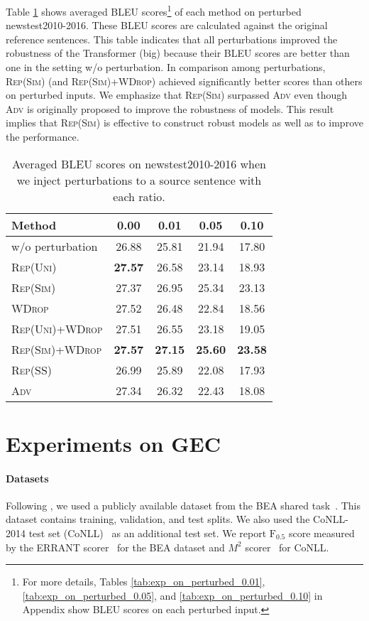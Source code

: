 \documentclass[11pt]{article}
\newcommand{\fscore}{\ensuremath{\mathrm{F}_{0.5}}}
\newcommand{\uniform}{\textsc{Rep(Uni)}}
\newcommand{\parass}{\textsc{Rep(SS)}}
\newcommand{\similarity}{\textsc{Rep(Sim)}}
\newcommand{\worddrop}{\textsc{WDrop}}
\newcommand{\adv}{\textsc{Adv}}
\begin{document}
Table \ref{tab:exp_on_perturbed_input} shows averaged BLEU scores\footnote{For more details, Tables \ref{tab:exp_on_perturbed_0.01}, \ref{tab:exp_on_perturbed_0.05}, and \ref{tab:exp_on_perturbed_0.10} in Appendix show BLEU scores on each perturbed input.} of each method on perturbed newstest2010-2016.
These BLEU scores are calculated against the original reference sentences.
This table indicates that all perturbations improved the robustness of the Transformer (big) because their BLEU scores are better than one in the setting w/o perturbation.
In comparison among perturbations, \similarity{} (and \similarity{}+\worddrop{}) achieved significantly better scores than others on perturbed inputs.
We emphasize that \similarity{} surpassed \adv{} even though \adv{} is originally proposed to improve the robustness of models.
This result implies that \similarity{} is effective to construct robust models as well as to improve the performance.


\begin{table}[!t]
  \centering
  \footnotesize
  \begin{tabular}{ l | c | c | c | c } \hline
  Method & 0.00 & 0.01 & 0.05 & 0.10 \\ \hline 
  w/o perturbation & 26.88 & 25.81 & 21.94 & 17.80 \\ \hline
  \uniform{} & \textbf{27.57} & 26.58 & 23.14 & 18.93 \\
  \similarity{} & 27.37 & 26.95 & 25.34 & 23.13 \\
  \worddrop{} & 27.52 & 26.48 & 22.84 & 18.56 \\
  \uniform{}+\worddrop{} & 27.51 & 26.55 & 23.18 & 19.05\\
  \similarity{}+\worddrop{} & \textbf{27.57} & \textbf{27.15} & \textbf{25.60} & \textbf{23.58} \\
  \parass{} & 26.99 & 25.89 & 22.08 & 17.93 \\
  \adv{} & 27.34 & 26.32 & 22.43 & 18.08 \\ \hline
  \end{tabular}
  \caption{Averaged BLEU scores on newstest2010-2016 when we inject perturbations to a source sentence with each ratio.\label{tab:exp_on_perturbed_input}}
\end{table}


\section{Experiments on GEC}
\label{sec:gec}


\paragraph{Datasets}
Following , we used a publicly available dataset from the BEA shared task~\cite{bryant:2019:bea}.
This dataset contains training, validation, and test splits.
We also used the CoNLL-2014 test set (CoNLL)~\citep{ng:2014:conll} as an additional test set.
We report \fscore{} score measured by the ERRANT scorer~\cite{bryant:2017:automatic,felice:2016:automatic} for the BEA dataset and $M^2$ scorer~\cite{dahlmeier:2012:M2} for CoNLL.
\end{document}
